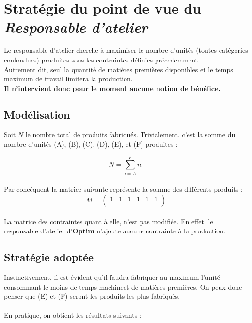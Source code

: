 \newpage
\section{Stratégie du point de vue du \textsl{Responsable d'atelier}}
Le responsable d'atelier cherche à maximiser le nombre d'unités (toutes
catégories confondues) produites sous les contraintes définies précedemment.\\
Autrement dit, seul la quantité de matières premières disponibles et le temps
maximum de travail limitera la production.\\
\textbf{Il n'intervient donc pour le moment aucune notion de bénéfice.}

\subsection{Modélisation}
Soit $N$ le nombre total de produits fabriqués. Trivialement, c'est la somme du nombre d'unités (A), (B), (C), (D),
(E), et (F) produites :

\begin{equation}
	N = \sum_{i = A}^{F} n_i
\end{equation} 
~\\
Par concéquent la matrice suivante représente la somme des différents produits :  
\begin{displaymath}
	M = \left(
	\begin{array}{cccccc}
		1 & 1 & 1 & 1 & 1 & 1\\
	\end{array}
	\right)
\end{displaymath}
~\\
La matrice des contraintes quant à elle, n'est pas modifiée. En effet, le responsable d'atelier d'\textbf{Optim} n'ajoute 
aucune contrainte à la production.

\subsection{Stratégie adoptée}
Instinctivement, il est évident qu'il faudra fabriquer au maximum l'unité consommant le moins de
\og temps machine\fg et de matières premières.
On peux donc penser que (E) et (F) seront les produits les plus fabriqués.\\
~\\
En pratique, on obtient les résultats suivants :\\


